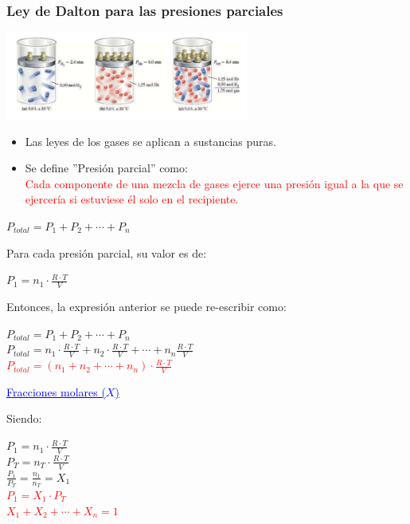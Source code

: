         \subsubsection{Ley de Dalton para las presiones parciales}
            \begin{center} \includegraphics[width=8cm]{./imagenes/dibujoLeyDeDaltonPresionesParciales.png} \end{center}
            \begin{itemize}
                \item Las leyes de los gases se aplican a sustancias puras.
                \item Se define ''Presión parcial'' como: \\
                    \textcolor{red}{Cada componente de una mezcla de gases ejerce una presión igual a la que se ejercería si estuviese él solo en el recipiente.}
            \end{itemize}
            \begin{center}
                $P_{total} = P_1 + P_2 + \dotsb + P_n$
            \end{center}
            \sangria{} Para cada presión parcial, su valor es de:
            \begin{center} $P_1 = n_1 \cdot \frac{R \cdot T}{V}$ \end{center}
            \sangria{} Entonces, la expresión anterior se puede re-escribir como:
            \begin{center}
                $P_{total} = P_1 + P_2 + \dotsb + P_n$ \\[5pt]
                $P_{total} = n_1 \cdot \frac{R \cdot T}{V} + n_2 \cdot \frac{R \cdot T}{V} + \dotsb + n_n \frac{R \cdot T}{V}$ \\[5pt]
                \textcolor{red}{\textbf{$P_{total} = (n_1 + n_2 + \dotsb + n_n) \cdot \frac{R \cdot T}{V}$}}
            \end{center}
            \begin{center} \textcolor{blue}{\underline{Fracciones molares ($X$)}} \end{center}
            \sangria{} Siendo:
            \begin{center}
                $P_1 = n_1 \cdot \frac{R \cdot T}{V}$ \\[5pt]
                $P_T = n_T \cdot \frac{R \cdot T}{V}$ \\[5pt]
                $\frac{P_1}{P_T} = \frac{n_1}{n_T} = X_1$ \\[5pt]
                \textcolor{red}{\textbf{$P_1 = X_1 \cdot P_T$}} \\[5pt]
                \textcolor{red}{\textbf{$X_1 + X_2 + \dotsb + X_n = 1$}}
            \end{center}
